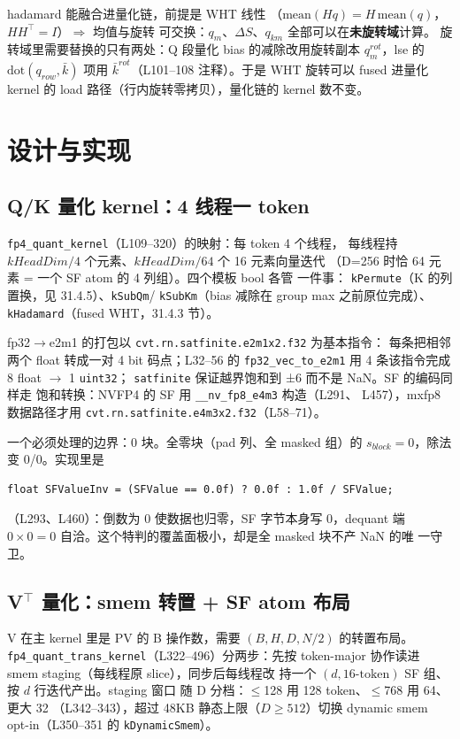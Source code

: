 hadamard 能融合进量化链，前提是 WHT 线性
（$\mathrm{mean}(Hq)=H\,\mathrm{mean}(q)$，$HH^\top=I$）$\Rightarrow$ 均值与旋转
可交换：$q_m$、$\Delta S$、$q_{km}$ 全部可以在\textbf{未旋转域}计算。
旋转域里需要替换的只有两处：Q 段量化 bias 的减除改用旋转副本
$q_m^{rot}$，lse 的 $\mathrm{dot}(q_{row},\bar k)$ 项用 $\bar
k^{rot}$（L101--108 注释）。于是 WHT 旋转可以 fused 进量化 kernel
的 load 路径（行内旋转零拷贝），量化链的 kernel 数不变。

\section{设计与实现}

\subsection{Q/K 量化 kernel：4 线程一 token}

\texttt{fp4\_quant\_kernel}（L109--320）的映射：每 token 4 个线程，
每线程持 $kHeadDim/4$ 个元素、$kHeadDim/64$ 个 16 元素向量迭代
（D=256 时恰 64 元素 = 一个 SF atom 的 4 列组）。四个模板 bool 各管
一件事：
\texttt{kPermute}（K 的列置换，见 31.4.5）、\texttt{kSubQm}/
\texttt{kSubKm}（bias 减除在 group max 之前原位完成）、
\texttt{kHadamard}（fused WHT，31.4.3 节）。

fp32$\to$e2m1 的打包以 \texttt{cvt.rn.satfinite.e2m1x2.f32} 为基本指令：
每条把相邻两个 float 转成一对 4 bit 码点；L32--56 的
\texttt{fp32\_vec\_to\_e2m1} 用 4 条该指令完成 8 float $\to$ 1 \texttt{uint32}；
\texttt{satfinite} 保证越界饱和到 ±6 而不是 NaN。SF 的编码同样走
饱和转换：NVFP4 的 SF 用 \texttt{\_\_nv\_fp8\_e4m3} 构造（L291、
L457），mxfp8 数据路径才用
\texttt{cvt.rn.satfinite.e4m3x2.f32}（L58--71）。

一个必须处理的边界：0 块。全零块（pad 列、全 masked 组）的
$s_{block}=0$，除法变 0/0。实现里是
\begin{lstlisting}[style=console]
float SFValueInv = (SFValue == 0.0f) ? 0.0f : 1.0f / SFValue;
\end{lstlisting}
（L293、L460）：倒数为 0 使数据也归零，SF 字节本身写 0，dequant 端
$0\times0=0$ 自洽。这个特判的覆盖面极小，却是全 masked 块不产 NaN 的唯
一守卫。

\subsection{V$^\top$ 量化：smem 转置 + SF atom 布局}

V 在主 kernel 里是 PV 的 B 操作数，需要 $(B,H,D,N/2)$ 的转置布局。
\texttt{fp4\_quant\_trans\_kernel}（L322--496）分两步：先按
token-major 协作读进 smem staging（每线程原 slice），同步后每线程改
持一个 $(d,16\text{-token})$ SF 组、按 $d$ 行迭代产出。staging 窗口
随 D 分档：$\le$128 用 128 token、$\le$768 用 64、更大 32
（L342--343），超过 48KB 静态上限（$D\ge512$）切换 dynamic smem
opt-in（L350--351 的 \texttt{kDynamicSmem}）。

